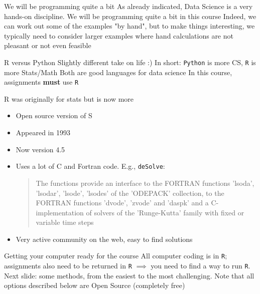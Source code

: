 \documentclass[aspectratio=169]{beamer}\usepackage[]{graphicx}\usepackage[]{xcolor}
\begin{document}
\begin{frame}{We will be programming quite a bit}
As already indicated, Data Science is a very hands-on discipline. We will be programming quite a bit in this course
\vfill
Indeed, we can work out some of the examples "by hand", but to make things interesting, we typically need to consider larger examples where hand calculations are not pleasant or not even feasible
\end{frame}

\begin{frame}{R versus Python}
Slightly different take on life :)
\vfill
In short: \texttt{Python} is more CS, \texttt{R} is more Stats/Math
\vfill
Both are good languages for data science
\vfill
In this course, assignments \textbf{must} use \texttt{R}
\end{frame}

\begin{frame}{R was originally for stats but is now more}
\begin{itemize}
\item Open source version of S
\vfill
\item Appeared in 1993
\vfill
\item Now version 4.5
\vfill
\item Uses a lot of C and Fortran code. E.g., \texttt{deSolve}:
\begin{quote}
The functions provide an interface to the FORTRAN functions 'lsoda', 'lsodar', 'lsode', 'lsodes' of the 'ODEPACK' collection, to the FORTRAN functions 'dvode', 'zvode' and 'daspk' and a C-implementation of solvers of the 'Runge-Kutta' family with fixed or variable time steps
\end{quote}
\vfill
\item Very active community on the web, easy to find solutions \end{itemize}
\end{frame}

\begin{frame}{Getting your computer ready for the course}
All computer coding is in \texttt{R}; assignments also need to be returned in \texttt{R}
\vfill
$\implies$ you need to find a way to run \texttt{R}. Next slide: some methods, from the easiest to the most challenging.
\vfill
Note that all options described below are Open Source (completely free)
\end{frame}
\end{document}
